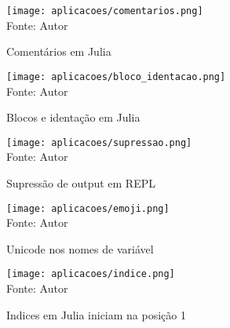     \begin{figure}[H]%
    \begin{center}
        \label{comentarios}
        \caption{Comentários em Julia} 
        \texttt{[image: aplicacoes/comentarios.png]} \\
        {\tiny \sf Fonte: Autor}
    \end{center}
    \end{figure} 

    \begin{figure}[H]%
    \begin{center}
        \label{blocos_identacao}
        \caption{Blocos e identação em Julia} 
        \texttt{[image: aplicacoes/bloco\_identacao.png]} \\
        {\tiny \sf Fonte: Autor}
    \end{center}
    \end{figure} 

 
    \begin{figure}[H]%
    \begin{center}
        \label{supressao}
        \caption{Supressão de output em REPL} %
        \texttt{[image: aplicacoes/supressao.png]} \\
        {\tiny \sf Fonte: Autor}
    \end{center}
    \end{figure} 

    \begin{figure}[H]%
      \begin{center}
        \label{emoji}
        \caption{Unicode nos nomes de variável} 
        \texttt{[image: aplicacoes/emoji.png]} \\
        {\tiny \sf Fonte: Autor}
    \end{center}
    \end{figure} 

    \begin{figure}[H]%
    \begin{center}
        \label{indice}
        \caption{Indices em Julia iniciam na posição 1} 
        \texttt{[image: aplicacoes/indice.png]} \\
        {\tiny \sf Fonte: Autor}
    \end{center}
    \end{figure} 

